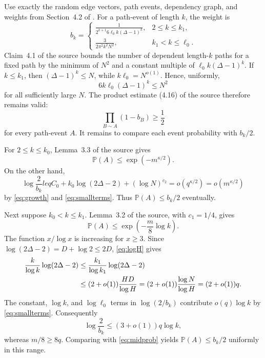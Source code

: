 \documentclass[11pt]{article}
\begin{document}
Use exactly the random edge vectors, path events, dependency graph, and
weights from Section~4.2 of \cite{ADTT}. For a path-event of length $k$, the
weight is
\[
 b_k=
 \begin{cases}
 \displaystyle\frac{1}{2^{k+1}6\ell_0 k(\Delta-1)^k},&2\leq k\leq k_1,\\[6pt]
 \displaystyle\frac{3}{2\pi^2k^2N^2},&k_1<k\leq\ell_0.
 \end{cases}
\]
Claim~4.1 of the source bounds the number of dependent length-$k$ paths for a
fixed path by the minimum of $N^2$ and a constant multiple of
$\ell_0k(\Delta-1)^k$. If $k\leq k_1$, then
$(\Delta-1)^k\leq N$, while $k\ell_0=N^{o(1)}$. Hence, uniformly,
\begin{equation}\label{eq:dependency}
 6k\ell_0(\Delta-1)^k\leq N^2
\end{equation}
for all sufficiently large $N$. The product estimate (4.16) of the source
therefore remains valid:
\begin{equation}\label{eq:product}
 \prod_{B\sim A}(1-b_B)\geq\frac12
\end{equation}
for every path-event $A$. It remains to compare each event probability with
$b_k/2$.

For $2\leq k\leq k_0$, Lemma~3.3 of the source gives
\[
 \mathbb P(A)\leq \exp(-m^{\kappa/2}).
\]
On the other hand,
\[
 \log\frac{2}{b_k}leq C_0+k_0\log(2\Delta-2)+(\log N)^{c_2}
 =o(q^{\kappa/2})=o(m^{\kappa/2})
\]
by \eqref{eq:growth} and \eqref{eq:smallterms}. Thus
$\mathbb P(A)\leq b_k/2$ eventually.

Next suppose $k_0<k\leq k_1$. Lemma~3.2 of the source, with $c_1=1/4$, gives
\begin{equation}\label{eq:midprob}
 \mathbb P(A)\leq \exp\left(-\frac m8\log k\right).
\end{equation}
The function $x/\log x$ is increasing for $x\geq3$. Since
$\log(2\Delta-2)=D+\log2\leq2D$, \eqref{eq:logH} gives
\begin{align}
 \frac{k}{\log k}\log(2\Delta-2)
 &\leq \frac{k_1}{\log k_1}\log(2\Delta-2)\notag\\
 &\leq (2+o(1))\frac{HD}{\log H}
  =(2+o(1))\frac{\log N}{\log H}
  =(2+o(1))q.\label{eq:middlecost}
\end{align}
The constant, $\log k$, and $\log\ell_0$ terms in $\log(2/b_k)$ contribute
$o(q)\log k$ by \eqref{eq:smallterms}. Consequently
\[
 \log\frac{2}{b_k}\leq(3+o(1))q\log k,
\]
whereas $m/8\geq8q$. Comparing with \eqref{eq:midprob} yields
$\mathbb P(A)\leq b_k/2$ uniformly in this range.
\end{document}

